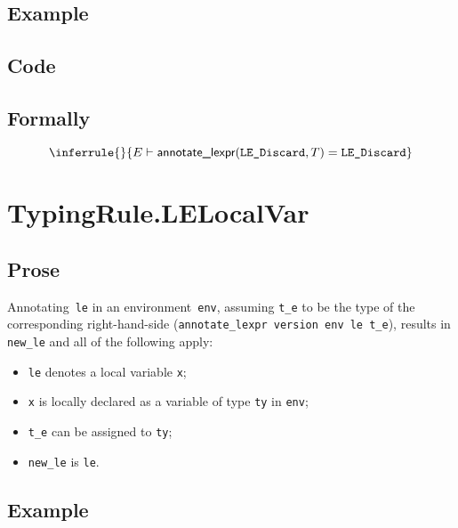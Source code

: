 \documentclass{book}
\newcommand\annotatelexpr[1]{\textsf{annotate\_lexpr}(#1)}
\begin{document}
  \subsection{Example}

  \subsection{Code}

\begin{emptyformal}
    \subsection{Formally}
\[
\inferrule{}{ E \entails \annotatelexpr{\texttt{LE\_Discard}, T} = \texttt{LE\_Discard} }
\]
\end{emptyformal}


\section{TypingRule.LELocalVar \label{sec:TypingRule.LELocalVar}}

   \subsection{Prose}
   Annotating~\texttt{le} in an environment~\texttt{env}, assuming
\texttt{t\_e} to be the type of the corresponding right-hand-side
(\texttt{annotate\_lexpr version env le t\_e}), results in \texttt{new\_le} and
all of the following apply:
   \begin{itemize}
   \item \texttt{le} denotes a local variable \texttt{x};
   \item \texttt{x} is locally declared as a variable of type \texttt{ty} in \texttt{env};
   \item \texttt{t\_e} can be assigned to \texttt{ty};
   \item \texttt{new\_le} is \texttt{le}.
   \end{itemize}

  \subsection{Example}
\end{document}
